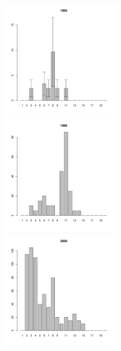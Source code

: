 \documentclass[12pt, a4paper]{article}
\begin{document}
\begin{figure}[h]

\begin{multicols}{3}
\hfill
\includegraphics[width=60mm]{../White_Sea/Luvenga_Goreliy/midlow_1992_.pdf}
\hfill
\includegraphics[width=60mm]{../White_Sea/Luvenga_Goreliy/midlow_1996_.pdf}
\hfill
\includegraphics[width=60mm]{../White_Sea/Luvenga_Goreliy/midlow_2000_.pdf}
\end{multicols}




\end{figure}
\end{document}
